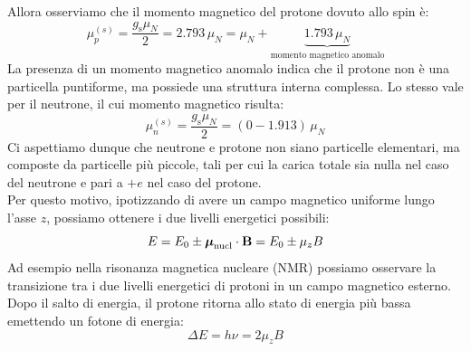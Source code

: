 Allora osserviamo che il momento magnetico del protone dovuto allo spin è:
\begin{equation}
 \mu_{p}^{(s)} = \dfrac{g_{\text{s}} \mu_N}{2} = 2.793\, \mu_N = \mu_N + \underbrace{1.793\,\mu_N}_{\text{momento magnetico anomalo}}
\end{equation}
La presenza di un momento magnetico anomalo indica che il protone non è una particella puntiforme, ma possiede una struttura interna complessa. Lo stesso vale per il neutrone, il cui momento magnetico risulta:
\begin{equation}
 \mu_{n}^{(s)} = \dfrac{g_{\text{s}} \mu_N}{2} = (0-1.913) \,\mu_N
\end{equation}
Ci aspettiamo dunque che neutrone e protone non siano particelle elementari, ma composte da particelle più piccole, tali per cui la carica totale sia nulla nel caso del neutrone e pari a $+e$ nel caso del protone.\\
Per questo motivo, ipotizzando di avere un campo magnetico uniforme lungo l'asse $z$, possiamo ottenere i due livelli energetici possibili:
\begin{equation}
 E = E_0 \pm \boldsymbol{\mu}_{\text{nucl}} \cdot \vb{B} = E_0 \pm \mu_{z} B
\end{equation}
Ad esempio nella risonanza magnetica nucleare (NMR) possiamo osservare la transizione tra i due livelli energetici di protoni in un campo magnetico esterno. Dopo il salto di energia, il protone ritorna allo stato di energia più bassa emettendo un fotone di energia:
\begin{equation}
 \Delta E = h \nu = 2 \mu_{z} B
\end{equation}



